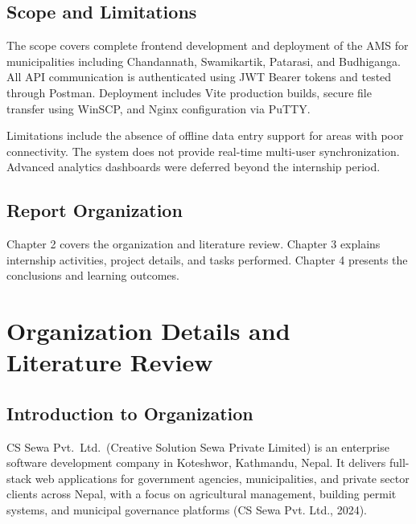 \documentclass[12pt,a4paper]{report}
\begin{document}
\section{Scope and Limitations}

The scope covers complete frontend development and deployment of the AMS for municipalities including Chandannath, Swamikartik, Patarasi, and Budhiganga. All API communication is authenticated using JWT Bearer tokens and tested through Postman. Deployment includes Vite production builds, secure file transfer using WinSCP, and Nginx configuration via PuTTY.

Limitations include the absence of offline data entry support for areas with poor connectivity. The system does not provide real-time multi-user synchronization. Advanced analytics dashboards were deferred beyond the internship period.

\section{Report Organization}

Chapter 2 covers the organization and literature review. Chapter 3 explains internship activities, project details, and tasks performed. Chapter 4 presents the conclusions and learning outcomes.

\chapter{Organization Details and Literature Review}

\section{Introduction to Organization}

CS Sewa Pvt.\ Ltd.\ (Creative Solution Sewa Private Limited) is an enterprise software
development company in Koteshwor, Kathmandu, Nepal. It delivers full-stack web
applications for government agencies, municipalities, and private sector clients across
Nepal, with a focus on agricultural management, building permit systems, and municipal
governance platforms (CS Sewa Pvt. Ltd., 2024).
\end{document}
